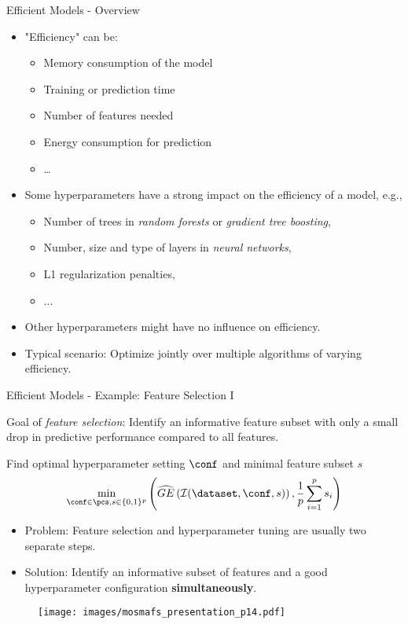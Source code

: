 \begin{frame}{Efficient Models - Overview}

\begin{itemize}
  \item "Efficiency" can be:
  \begin{itemize}
    \item Memory consumption of the model
    \item Training or prediction time
    \item Number of features needed
    \item Energy consumption for prediction
    \item \ldots
  \end{itemize}
  \item Some hyperparameters have a strong impact on the efficiency of a model, e.g.,
  \begin{itemize}
    \item Number of trees in \emph{random forests} or \emph{gradient tree boosting},
    \item Number, size and type of layers in \emph{neural networks},
    \item L1 regularization penalties,
    \item ...
  \end{itemize}
  \item Other hyperparameters might have no influence on efficiency.
  \item Typical scenario: Optimize jointly over multiple algorithms of varying efficiency.
\end{itemize}

\end{frame}

\begin{frame}{Efficient Models - Example: Feature Selection I}

Goal of \emph{feature selection}: Identify an informative feature subset with only a small drop in predictive performance compared to all features.

    \vspace{0.5cm}
Find optimal hyperparameter setting $\conf$ and minimal feature subset $s$
\[
\min_{\conf \in \pcs, s \in \{0,1\}^p}\left( \widehat{GE}\left(\inducer(\dataset, \conf, s)\right), \frac{1}{p}\sum_{i=1}^p s_i \right)
\]
\begin{itemize}
  \item Problem: Feature selection and hyperparameter tuning are usually two separate steps.
  \item Solution: Identify an informative subset of features and a good hyperparameter configuration \textbf{simultaneously}.

\end{itemize}
\begin{figure}
  \centering
  \texttt{[image: images/mosmafs\_presentation\_p14.pdf]}
\end{figure}

\end{frame}

